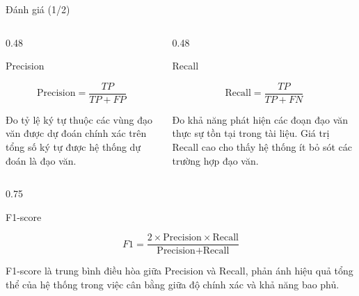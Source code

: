 \documentclass[aspectratio=169,11pt]{beamer}
\begin{document}
\begin{frame}{Đánh giá (1/2)}

\small

\begin{columns}[T]

\begin{column}{0.48\textwidth}

\begin{block}{Precision}

\[
\text{Precision}=\frac{TP}{TP+FP}
\]

Đo tỷ lệ ký tự thuộc các vùng đạo văn được dự đoán chính xác trên tổng số ký tự được
hệ thống dự đoán là đạo văn.

\end{block}

\end{column}

\begin{column}{0.48\textwidth}

\begin{block}{Recall}

\[
\text{Recall}=\frac{TP}{TP+FN}
\]

Đo khả năng phát hiện các đoạn đạo văn thực sự tồn tại trong tài liệu. Giá trị Recall cao
cho thấy hệ thống ít bỏ sót các trường hợp đạo văn.

\end{block}

\end{column}

\end{columns}

\vspace{-0.2cm}

\begin{columns}[c]

\begin{column}{0.75\textwidth}

\begin{block}{F1-score}

\[
F1=\frac{2\times\text{Precision}\times\text{Recall}}
{\text{Precision}+\text{Recall}}
\]

F1-score là trung bình điều hòa giữa Precision và Recall, phản ánh hiệu quả tổng thể của hệ
thống trong việc cân bằng giữa độ chính xác và khả năng bao phủ.

\end{block}

\end{column}

\end{columns}

\end{frame}
\end{document}
